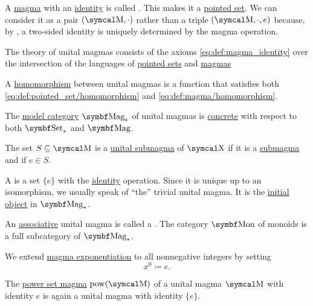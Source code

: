 \begin{definition}\label{def:unital_magma}
  A \hyperref[def:magma]{magma} with an \hyperref[def:magma_identity]{identity} is called . This makes it a \hyperref[def:pointed_set]{pointed set}. We can consider it as a pair \( (\CM, \cdot) \) rather than a triple \( (\CM, \cdot, e) \) because, by , a two-sided identity is uniquely determined by the magma operation.

  \begin{DefEnum}
     The theory of unital magmas consists of the axioms \eqref{eq:def:magma_identity} over the intersection of the languages of \hyperref[def:pointed_set/theory]{pointed sets} and \hyperref[def:magma/theory]{magmas}

     A \hyperref[def:first_order_homomorphism]{homomorphism} between unital magmas is a function that satisfies both \eqref{eq:def:pointed_set/homomorphism} and \eqref{eq:def:magma/homomorphism}.

     The \hyperref[def:first_order_model_category]{model category} \( \Cat{Mag}_* \) of unital magmas is \hyperref[def:concrete_category]{concrete} with respect to both \hyperref[def:pointed_set/category]{\( \Cat{Set}_* \)} and \hyperref[def:magma/category]{\( \Cat{Mag} \)}.

     The set \( S \subseteq \CM \) is a \hyperref[def:first_order_substructure]{unital submagma} of \( \CX \) if it is a \hyperref[def:magma/substructure]{submagma} and if \( e \in S \).

     A  is a set \( \{ e \} \) with the \hyperref[def:function/diagonal]{identity} operation. Since it is unique up to an isomorphism, we usually speak of \enquote{the} trivial unital magma. It is the \hyperref[def:zero_objects/initial]{initial object} in \( \Cat{Mag}_* \).

     An \hyperref[eq:def:magma/associative]{associative} unital magma is called a . The category \( \Cat{Mon} \) of monoids is a full subcategory of \( \Cat{Mag}_* \).

     We extend \hyperref[def:magma/exponentiation]{magma exponentiation} to all nonnegative integers by setting
    \begin{equation*}
      x^0 \coloneqq e.
    \end{equation*}

     The \hyperref[def:magma/power_set]{power set magma} \( \Pow(\CM) \) of a unital magma \( \CM \) with identity \( e \) is again a unital magma with identity \( \{ e \} \).
  \end{DefEnum}
\end{definition}

